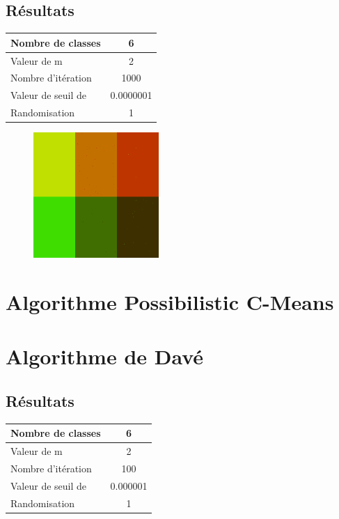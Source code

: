 \documentclass[a4paper,11pt]{article}
\begin{document}
\subsection{Résultats}

\begin{tabular}{|l|c|}
  \hline
  Nombre de classes & 6 \\
  \hline
  Valeur de m & 2 \\
  \hline
  Nombre d'itération & 1000 \\
  \hline
  Valeur de seuil de  & 0.0000001 \\
  \hline
  Randomisation & 1 \\
  \hline
\end{tabular}

\begin{figure}[H]
  \begin{center} 
    \includegraphics[width=180px]{../img/segHCM.png}
    \caption{}
  \end{center}
\end{figure}

\section{Algorithme Possibilistic C-Means}

\section{Algorithme de Davé}

\subsection{Résultats}

\begin{tabular}{|l|c|}
  \hline
  Nombre de classes & 6 \\
  \hline
  Valeur de m & 2 \\
  \hline
  Nombre d'itération & 100 \\
  \hline
  Valeur de seuil de  & 0.000001 \\
  \hline
  Randomisation & 1 \\
  \hline
\end{tabular}

\begin{figure}[H]
  \begin{center} 
    \caption{}
  \end{center}
\end{figure}
\end{document}
